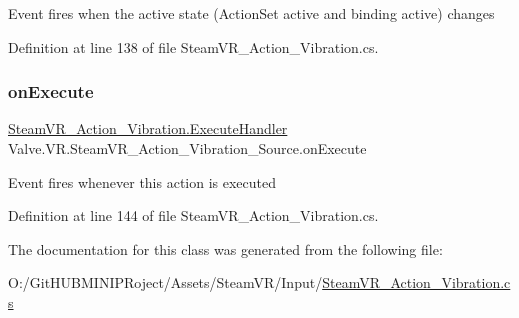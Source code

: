 Event fires when the active state (Action\+Set active and binding active) changes 



Definition at line 138 of file Steam\+V\+R\+\_\+\+Action\+\_\+\+Vibration.\+cs.

\mbox{\label{class_valve_1_1_v_r_1_1_steam_v_r___action___vibration___source_a926343ccb67835caf49722a792e2b49b}} 
\subsubsection{\texorpdfstring{onExecute}{onExecute}}
{\footnotesize\ttfamily \mbox{\hyperlink{class_valve_1_1_v_r_1_1_steam_v_r___action___vibration_ac075e9e8f3e9eea89be32c403e6f86d5}{Steam\+V\+R\+\_\+\+Action\+\_\+\+Vibration.\+Execute\+Handler}} Valve.\+V\+R.\+Steam\+V\+R\+\_\+\+Action\+\_\+\+Vibration\+\_\+\+Source.\+on\+Execute}



Event fires whenever this action is executed 



Definition at line 144 of file Steam\+V\+R\+\_\+\+Action\+\_\+\+Vibration.\+cs.



The documentation for this class was generated from the following file\+:\begin{DoxyCompactItemize}
\item 
O\+:/\+Git\+H\+U\+B\+M\+I\+N\+I\+P\+Roject/\+Assets/\+Steam\+V\+R/\+Input/\mbox{\hyperlink{_steam_v_r___action___vibration_8cs}{Steam\+V\+R\+\_\+\+Action\+\_\+\+Vibration.\+cs}}\end{DoxyCompactItemize}
